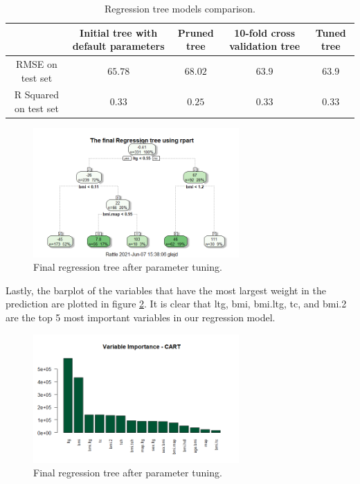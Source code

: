 \documentclass{usiinftr}
\begin{document}
\begin{table}
\centering \caption{Regression tree models comparison.} \label{CARTresults}
\begin{tabular}{|c|c|c|c|c|}
\hline & Initial tree with default parameters & Pruned tree & 10-fold cross validation tree & Tuned tree \\
\hline RMSE on test set & $65.78$ & $68.02$ & $63.9$ & $63.9$ \\
\hline R Squared on test set & $0.33$ & $0.25$ & $0.33$ & $0.33$ \\
\hline
\end{tabular}
\end{table}


\begin{figure}[h!] 
\centering
\includegraphics[width=0.7\textwidth]{images/image110.png}
\caption{Final regression tree after parameter tuning.}
\label{CARTfinal}
\end{figure}


Lastly, the barplot of the variables that have the most largest weight in the prediction are plotted in figure \ref{CARTimp}. It is clear that ltg, bmi, bmi.ltg, tc, and bmi.2 are the top 5 most important variables in our regression model. 

\begin{figure}[h!] 
\centering
\includegraphics[width=0.7\textwidth]{images/image112.png}
\caption{Final regression tree after parameter tuning.}
\label{CARTimp}
\end{figure}
\end{document}
